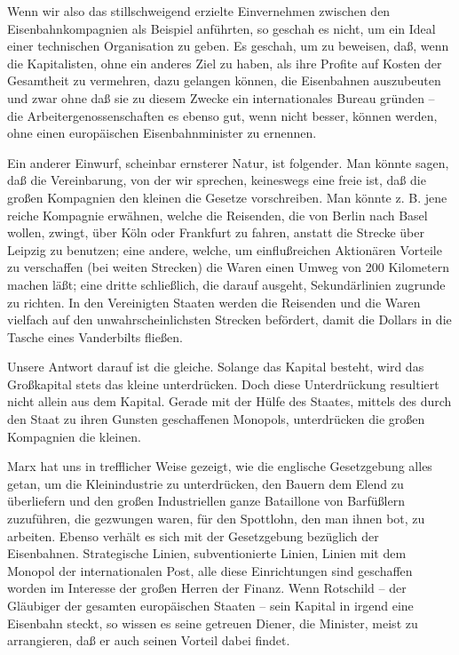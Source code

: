 \documentclass{scrbook}
\begin{document}
Wenn wir also das stillschweigend erzielte Einvernehmen zwischen den Eisenbahnkompagnien als Beispiel anführten, so geschah es nicht, um ein Ideal einer technischen Organisation zu geben. Es geschah, um zu beweisen, daß, wenn die Kapitalisten, ohne ein anderes Ziel zu haben, als ihre Profite auf Kosten der Gesamtheit zu vermehren, dazu gelangen können, die Eisenbahnen auszubeuten und zwar ohne daß sie zu diesem Zwecke ein internationales Bureau gründen – die Arbeitergenossenschaften es ebenso gut, wenn nicht besser, können werden, ohne einen europäischen Eisenbahnminister zu ernennen.

Ein anderer Einwurf, scheinbar ernsterer Natur, ist folgender. Man könnte sagen, daß die Vereinbarung, von der wir sprechen, keineswegs eine freie ist, daß die großen Kompagnien den kleinen die Gesetze vorschreiben. Man könnte z. B. jene reiche Kompagnie erwähnen, welche die Reisenden, die von Berlin nach Basel wollen, zwingt, über Köln oder Frankfurt zu fahren, anstatt die Strecke über Leipzig zu benutzen; eine andere, welche, um einflußreichen Aktionären Vorteile zu verschaffen (bei weiten Strecken) die Waren einen Umweg von 200 Kilometern machen läßt; eine dritte schließlich, die darauf ausgeht, Sekundärlinien zugrunde zu richten. In den Vereinigten Staaten werden die Reisenden und die Waren vielfach auf den unwahrscheinlichsten Strecken befördert, damit die Dollars in die Tasche eines Vanderbilts fließen.

Unsere Antwort darauf ist die gleiche. Solange das Kapital besteht, wird das Großkapital stets das kleine unterdrücken. Doch diese Unterdrückung resultiert nicht allein aus dem Kapital. Gerade mit der Hülfe des Staates, mittels des durch den Staat zu ihren Gunsten geschaffenen Monopols, unterdrücken die großen Kompagnien die kleinen.

Marx hat uns in trefflicher Weise gezeigt, wie die englische Gesetzgebung alles getan, um die Kleinindustrie zu unterdrücken, den Bauern dem Elend zu überliefern und den großen Industriellen ganze Bataillone von Barfüßlern zuzuführen, die gezwungen waren, für den Spottlohn, den man ihnen bot, zu arbeiten. Ebenso verhält es sich mit der Gesetzgebung bezüglich der Eisenbahnen. Strategische Linien, subventionierte Linien, Linien mit dem Monopol der internationalen Post, alle diese Einrichtungen sind geschaffen worden im Interesse der großen Herren der Finanz. Wenn Rotschild – der Gläubiger der gesamten europäischen Staaten – sein Kapital in irgend eine Eisenbahn steckt, so wissen es seine getreuen Diener, die Minister, meist zu arrangieren, daß er auch seinen Vorteil dabei findet.
\end{document}
